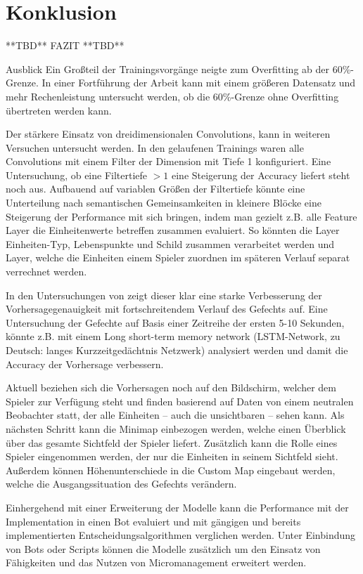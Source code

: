 \section{Konklusion}
**TBD** FAZIT **TBD**

Ausblick
Ein Großteil der Trainingsvorgänge neigte zum Overfitting ab der 60\%-Grenze. In einer Fortführung der Arbeit kann mit einem größeren Datensatz und mehr Rechenleistung untersucht werden, ob die 60\%-Grenze ohne Overfitting übertreten werden kann. 

Der stärkere Einsatz von dreidimensionalen Convolutions, kann in weiteren Versuchen untersucht werden. In den gelaufenen Trainings waren alle Convolutions mit einem Filter der Dimension mit Tiefe 1 konfiguriert. Eine Untersuchung, ob eine Filtertiefe $>1$ eine Steigerung der Accuracy liefert steht noch aus. Aufbauend auf variablen Größen der Filtertiefe könnte   eine Unterteilung nach semantischen Gemeinsamkeiten in kleinere Blöcke eine Steigerung der Performance mit sich bringen, indem man gezielt z.B. alle Feature Layer die Einheitenwerte betreffen zusammen evaluiert. So könnten die Layer Einheiten-Typ, Lebenspunkte und Schild zusammen verarbeitet werden und Layer, welche die Einheiten einem Spieler zuordnen im späteren Verlauf separat verrechnet werden.

In den Untersuchungen von \textcite{SnchezRuizGranados2015PredictingTO} zeigt dieser klar eine starke Verbesserung der Vorhersagegenauigkeit mit fortschreitendem Verlauf des Gefechts auf. Eine Untersuchung der Gefechte auf Basis einer Zeitreihe der ersten 5-10 Sekunden, könnte z.B. mit einem Long short-term memory network (LSTM-Network, zu Deutsch: langes Kurzzeitgedächtnis Netzwerk) analysiert werden und damit die Accuracy der Vorhersage verbessern. 

Aktuell beziehen sich die Vorhersagen noch auf den Bildschirm, welcher dem Spieler zur Verfügung steht und finden basierend auf Daten von einem neutralen Beobachter statt, der alle Einheiten -- auch die unsichtbaren -- sehen kann. Als nächsten Schritt kann die Minimap einbezogen werden, welche einen Überblick über das gesamte Sichtfeld der Spieler liefert. Zusätzlich kann die Rolle eines Spieler eingenommen werden, der nur die Einheiten in seinem Sichtfeld sieht. Außerdem können Höhenunterschiede in die Custom Map eingebaut werden, welche die Ausgangssituation des Gefechts verändern. 

Einhergehend mit einer Erweiterung der Modelle kann die Performance mit der Implementation in einen Bot evaluiert und mit gängigen und bereits implementierten Entscheidungsalgorithmen verglichen werden. Unter Einbindung von Bots oder Scripts können die Modelle zusätzlich um den Einsatz von Fähigkeiten und das Nutzen von Micromanagement erweitert werden. 